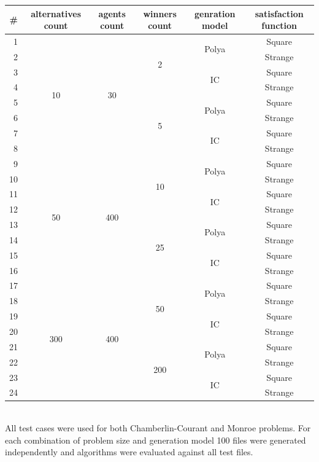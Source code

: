 \begin{tabular}{r | c | c | c | c | c |}
	\# & alternatives count & agents count & winners count & genration model & satisfaction function \\
	\hline
	1 & \multirow{8}{*}{10} & \multirow{8}{*}{30} & \multirow{4}{*}{2} & \multirow{2}{*}{Polya} & Square \\
	2 & & & & & Strange \\
	\cline{5-6}
	3 & & & & \multirow{2}{*}{IC} & Square \\
	4 & & & & & Strange \\
	\cline{4-6}
	5 & & & \multirow{4}{*}{5} & \multirow{2}{*}{Polya} & Square \\
	6 & & & & & Strange \\
	\cline{5-6}
	7 & & & & \multirow{2}{*}{IC} & Square \\
	8 & & & & & Strange \\
	\hline
	9 & \multirow{8}{*}{50} & \multirow{8}{*}{400} & \multirow{4}{*}{10} & \multirow{2}{*}{Polya} & Square \\
	10 & & & & & Strange \\
	\cline{5-6}
	11 & & & & \multirow{2}{*}{IC} & Square \\
	12 & & & & & Strange \\
	\cline{4-6}
	13 & & & \multirow{4}{*}{25} & \multirow{2}{*}{Polya} & Square \\
	14 & & & & & Strange \\
	\cline{5-6}
	15 & & & & \multirow{2}{*}{IC} & Square \\
	16 & & & & & Strange \\
	\hline
	17 & \multirow{8}{*}{300} & \multirow{8}{*}{400} & \multirow{4}{*}{50} & \multirow{2}{*}{Polya} & Square \\
	18 & & & & & Strange \\
	\cline{5-6}
	19 & & & & \multirow{2}{*}{IC} & Square \\
	20 & & & & & Strange \\
	\cline{4-6}
	21 & & & \multirow{4}{*}{200} & \multirow{2}{*}{Polya} & Square \\
	22 & & & & & Strange \\
	\cline{5-6}
	23 & & & & \multirow{2}{*}{IC} & Square \\
	24 & & & & & Strange \\
	\hline
\end{tabular}
\\

All test cases were used for both Chamberlin-Courant and Monroe problems. For each combination of problem size and generation model 100 files were generated independently and algorithms were evaluated against all test files.